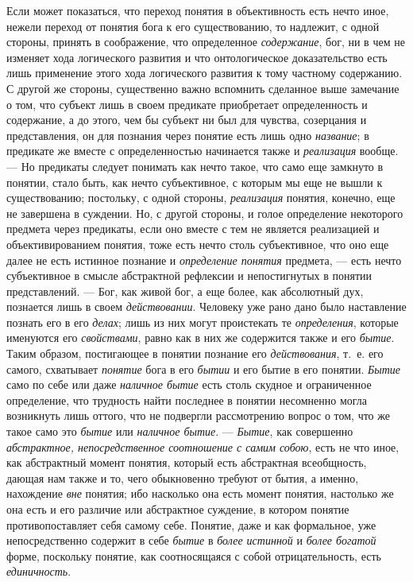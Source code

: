 \documentclass[twoside]{article}
\begin{document}
{{{{{{Если может показаться, что переход понятия в объективность
есть нечто иное, нежели переход от понятия бога к его существованию, то
надлежит, с одной стороны, принять в соображение, что определенное
{\em содержание}, бог, ни
в чем не изменяет хода логического развития и что онтологическое
доказательство есть лишь применение этого хода логического развития к тому
частному содержанию. С другой же стороны, существенно важно вспомнить
сделанное выше замечание о том, что субъект лишь в своем предикате
приобретает определенность и содержание, а до этого, чем бы субъект ни был
для чувства, созерцания и представления, он для познания через понятие есть
лишь одно {\em название};
в предикате же вместе с определенностью начинается также и
{\em реализация} вообще.
— Но предикаты следует понимать как нечто такое, что само еще
замкнуто в понятии, стало быть, как нечто субъективное, с которым мы еще не
вышли к существованию; постольку, с одной стороны,
{\em реализация} понятия,
конечно, еще не завершена в суждении. Но, с другой стороны, и голое
определение некоторого предмета через предикаты, если оно вместе с тем не
является реализацией и объективированием понятия, тоже есть нечто столь
субъективное, что оно еще далее не есть истинное познание и
{\em определение понятия}
предмета, — есть нечто субъективное в смысле
абстрактной рефлексии и непостигнутых в понятии представлений. —
Бог, как живой бог, а еще более, как абсолютный дух,
познается лишь в своем
{\em действовании}.
Человеку уже рано дано было наставление познать его в его
{\em делах}; лишь из них
могут проистекать те {\em определения},
которые именуются его
{\em свойствами}, равно
как в них же содержится также и его
{\em бытие}. Таким
образом, постигающее в понятии познание его
{\em действования}, т.~е.
его самого, схватывает {\em понятие}
бога в его {\em бытии}
и его бытие в его понятии.
{\em Бытие} само по себе
или даже {\em наличное бытие}
есть столь скудное и ограниченное определение, что трудность
найти последнее в понятии несомненно могла возникнуть лишь оттого, что не
подвергли рассмотрению вопрос о том, что же такое само это
{\em бытие} или
{\em наличное бытие}. —
{\em Бытие}, как
совершенно {\em абстрактное,
непосредственное соотношение с самим собою}, есть не что
иное, как абстрактный момент понятия, который есть
абстрактная всеобщность, дающая нам также и то, чего обыкновенно требуют от
бытия, а именно, нахождение {\em вне}
понятия; ибо насколько она есть момент понятия, настолько же
она есть и его различие или абстрактное суждение, в котором понятие
противопоставляет себя самому себе. Понятие, даже и как формальное, уже
непосредственно содержит в себе
{\em бытие} в
{\em более истинной} и
{\em более богатой}
форме, поскольку понятие, как соотносящаяся с собой
отрицательность, есть
{\em единичность}.

}}}}}}
\end{document}

